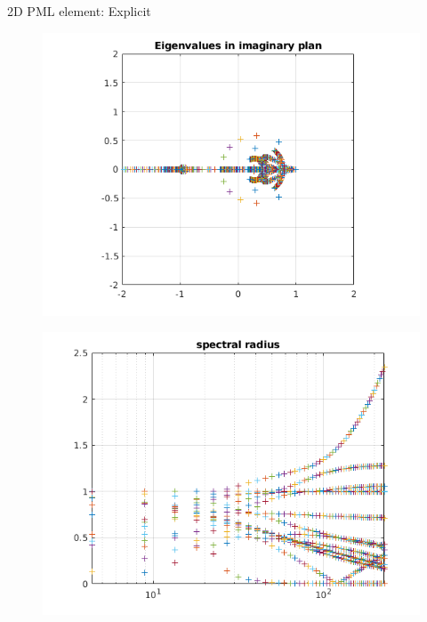 \begin{frame}{2D PML element: Explicit}
\begin{figure}[ht] 
  \label{ fig7} 
  \begin{minipage}[b]{0.5\linewidth}
    \centering
    \includegraphics[scale=.4]{images/2Dpml-exp-1.png} \\

  \end{minipage}%
  \begin{minipage}[b]{0.5\linewidth}
    \centering
    \includegraphics[scale=.4]{images/2Dpml-exp-2.png} \\
  \end{minipage} 

\end{figure}
\end{frame}
